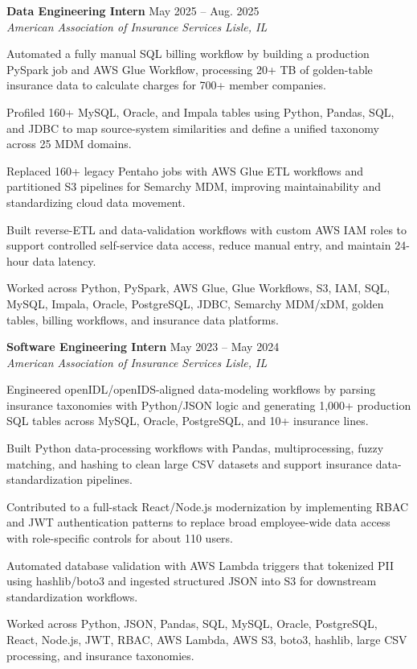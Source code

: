 \documentclass[letterpaper,10pt]{article}
\newcommand{\resumeSubheading}[4]{
  \vspace{2pt}
  \textbf{#1} \hfill #2\\
  \textit{#3} \hfill \textit{#4}
}
\begin{document}
\resumeSubheading
{Data Engineering Intern}{May 2025 -- Aug. 2025}
{American Association of Insurance Services}{Lisle, IL}
\begin{tightitemize}
  \item Automated a fully manual SQL billing workflow by building a production PySpark job and AWS Glue Workflow, processing 20+ TB of golden-table insurance data to calculate charges for 700+ member companies.
  \item Profiled 160+ MySQL, Oracle, and Impala tables using Python, Pandas, SQL, and JDBC to map source-system similarities and define a unified taxonomy across 25 MDM domains.
  \item Replaced 160+ legacy Pentaho jobs with AWS Glue ETL workflows and partitioned S3 pipelines for Semarchy MDM, improving maintainability and standardizing cloud data movement.
  \item Built reverse-ETL and data-validation workflows with custom AWS IAM roles to support controlled self-service data access, reduce manual entry, and maintain 24-hour data latency.
  \item Worked across Python, PySpark, AWS Glue, Glue Workflows, S3, IAM, SQL, MySQL, Impala, Oracle, PostgreSQL, JDBC, Semarchy MDM/xDM, golden tables, billing workflows, and insurance data platforms.
\end{tightitemize}

\resumeSubheading
{Software Engineering Intern}{May 2023 -- May 2024}
{American Association of Insurance Services}{Lisle, IL}
\begin{tightitemize}
  \item Engineered openIDL/openIDS-aligned data-modeling workflows by parsing insurance taxonomies with Python/JSON logic and generating 1,000+ production SQL tables across MySQL, Oracle, PostgreSQL, and 10+ insurance lines.
  \item Built Python data-processing workflows with Pandas, multiprocessing, fuzzy matching, and hashing to clean large CSV datasets and support insurance data-standardization pipelines.
  \item Contributed to a full-stack React/Node.js modernization by implementing RBAC and JWT authentication patterns to replace broad employee-wide data access with role-specific controls for about 110 users.
  \item Automated database validation with AWS Lambda triggers that tokenized PII using hashlib/boto3 and ingested structured JSON into S3 for downstream standardization workflows.
  \item Worked across Python, JSON, Pandas, SQL, MySQL, Oracle, PostgreSQL, React, Node.js, JWT, RBAC, AWS Lambda, AWS S3, boto3, hashlib, large CSV processing, and insurance taxonomies.
\end{tightitemize}
\end{document}
